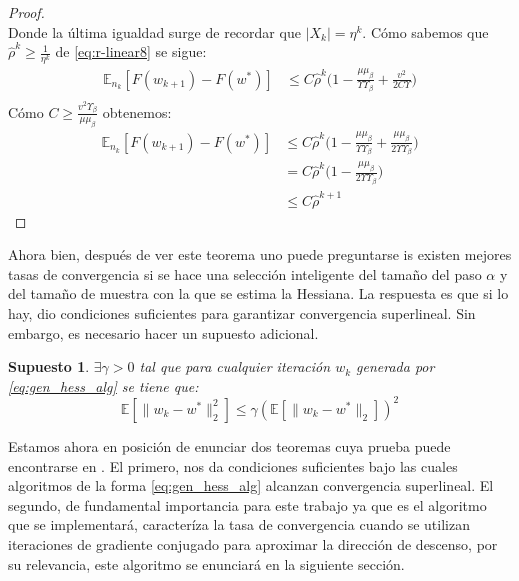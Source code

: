 \documentclass{book}
\theoremstyle{plain}
\newtheorem{assump}{Supuesto}[thm]
\theoremstyle{definition}
\theoremstyle{remark}
\begin{document}
\begin{proof}
\begin{equation}
\end{equation}
Donde la última igualdad surge de recordar que $|X_k|=\eta^k$. Cómo sabemos que $\hat{\rho}^k \geq \frac{1}{\eta^k}$ de \ref{eq:r-linear8} se sigue:
\begin{equation}\label{eq:r-linear9}
    \begin{split}
        \mathbb{E}_{n_k}[F(w_{k+1})- F(w^*)] & \leq C\hat{\rho}^k\bigg(1 -\frac{\mu\mu_\beta}{\Upsilon\Upsilon_\beta}+ \frac{v^2}{2C\Upsilon}\bigg)\\
    \end{split}
\end{equation}
Cómo $C \geq \frac{v^2\Upsilon_\beta}{\mu\mu_\beta}$ obtenemos:
\begin{equation}\label{eq:r-linear8}
    \begin{split}
        \mathbb{E}_{n_k}[F(w_{k+1})- F(w^*)] & \leq C\hat{\rho}^k\bigg(1 -\frac{\mu\mu_\beta}{\Upsilon\Upsilon_\beta}+\frac{\mu\mu_\beta}{2\Upsilon\Upsilon_\beta}\bigg)\\
         & = C\hat{\rho}^k\bigg(1 -\frac{\mu\mu_\beta}{2\Upsilon\Upsilon_\beta}\bigg)\\
         & \leq C\hat{\rho}^{k+1}
    \end{split}
\end{equation}
\end{proof}
Ahora bien, después de ver este teorema uno puede preguntarse is existen mejores tasas de convergencia si se hace una selección inteligente del tamaño del paso $\alpha$ y del tamaño de muestra con la que se estima la Hessiana. La respuesta es que si lo hay, \cite{ROOSTA} dio condiciones suficientes para garantizar convergencia superlineal. Sin embargo, es necesario hacer un supuesto adicional.
\begin{assump}\label{assump:acot_moment}
$\exists \gamma >0 $ tal que para cualquier iteración $w_k$ generada por \ref{eq:gen_hess_alg} se tiene que:
\begin{equation*}
    \mathbb{E}[\|w_k - w^*\|_2^2]\leq\gamma(\mathbb{E}[\|w_k - w^*\|_2])^2
\end{equation*}
\end{assump}
Estamos ahora en posición de enunciar dos teoremas cuya prueba puede encontrarse en \cite{ROOSTA}. El primero, nos da condiciones suficientes bajo las cuales algoritmos de la forma \ref{eq:gen_hess_alg} alcanzan convergencia superlineal. El segundo, de fundamental importancia para este trabajo ya que es el algoritmo que se implementará, caracteríza la tasa de convergencia cuando se utilizan iteraciones de gradiente conjugado\cite{NOCEDAL} para aproximar la dirección de descenso, por su relevancia, este algoritmo se enunciará en la siguiente sección.
\end{document}
